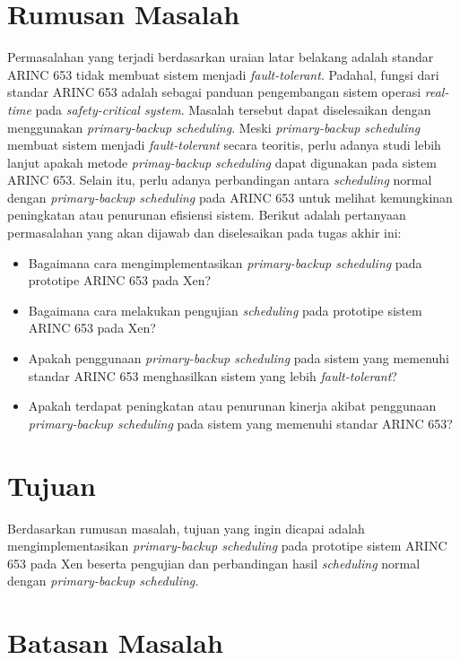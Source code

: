\section{Rumusan Masalah}

Permasalahan yang terjadi berdasarkan uraian latar belakang adalah standar ARINC 653 tidak membuat sistem menjadi \textit{fault-tolerant}.
Padahal, fungsi dari standar ARINC 653 adalah sebagai panduan pengembangan sistem operasi \textit{real-time} pada \textit{safety-critical system}.
Masalah tersebut dapat diselesaikan dengan menggunakan \textit{primary-backup scheduling}.
Meski \textit{primary-backup scheduling} membuat sistem menjadi \textit{fault-tolerant} secara teoritis, perlu adanya studi lebih lanjut apakah metode \textit{primay-backup scheduling} dapat digunakan pada sistem ARINC 653.
Selain itu, perlu adanya perbandingan antara \textit{scheduling} normal dengan \textit{primary-backup scheduling} pada ARINC 653 untuk melihat kemungkinan peningkatan atau penurunan efisiensi sistem.
Berikut adalah pertanyaan permasalahan yang akan dijawab dan diselesaikan pada tugas akhir ini:

\begin{itemize}
    \item Bagaimana cara mengimplementasikan \textit{primary-backup scheduling} pada prototipe ARINC 653 pada Xen?
    \item Bagaimana cara melakukan pengujian \textit{scheduling} pada prototipe sistem ARINC 653 pada Xen?
    \item Apakah penggunaan \textit{primary-backup scheduling} pada sistem yang memenuhi standar ARINC 653 menghasilkan sistem yang lebih \textit{fault-tolerant}?
    \item Apakah terdapat peningkatan atau penurunan kinerja akibat penggunaan \textit{primary-backup scheduling} pada sistem yang memenuhi standar ARINC 653?
\end{itemize}

\section{Tujuan}

Berdasarkan rumusan masalah, tujuan yang ingin dicapai adalah mengimplementasikan \textit{primary-backup scheduling} pada prototipe sistem ARINC 653 pada Xen beserta pengujian dan perbandingan hasil \textit{scheduling} normal dengan \textit{primary-backup scheduling.}


\section{Batasan Masalah}
\label{section:batasan_masalah}


